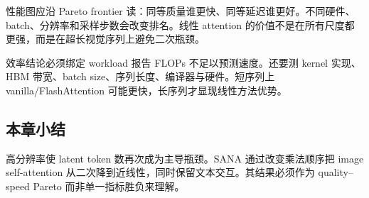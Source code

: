 
性能图应沿 Pareto frontier 读：同等质量谁更快、同等延迟谁更好。不同硬件、batch、分辨率和采样步数会改变排名。线性 attention 的价值不是在所有尺度都更强，而是在超长视觉序列上避免二次瓶颈。

\begin{importantbox}{效率结论必须绑定 workload}
报告 FLOPs 不足以预测速度。还要测 kernel 实现、HBM 带宽、batch size、序列长度、编译器与硬件。短序列上 vanilla/FlashAttention 可能更快，长序列才显现线性方法优势。
\end{importantbox}


\subsection{本章小结}

高分辨率使 latent token 数再次成为主导瓶颈。SANA 通过改变乘法顺序把 image self-attention 从二次降到近线性，同时保留文本交互。其结果必须作为 quality--speed Pareto 而非单一指标胜负来理解。

